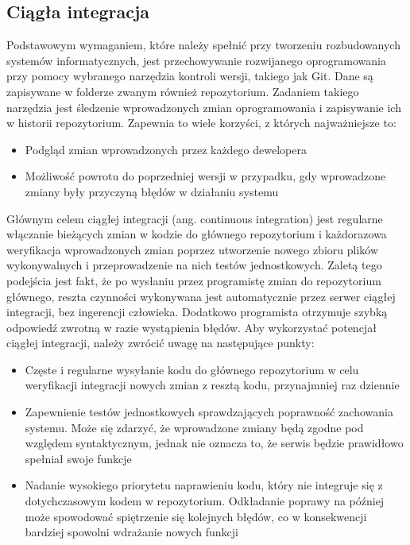 \documentclass[11pt, a4]{article} %
\begin{document}
\subsection{Ciągła integracja}

Podstawowym wymaganiem, które należy spełnić przy tworzeniu rozbudowanych systemów 
informatycznych, jest przechowywanie rozwijanego oprogramowania przy pomocy wybranego 
narzędzia kontroli wersji, takiego jak Git. Dane są zapisywane w folderze zwanym 
również repozytorium. Zadaniem takiego narzędzia jest śledzenie wprowadzonych zmian 
oprogramowania i zapisywanie ich w historii repozytorium. Zapewnia to wiele 
korzyści, z których najważniejsze to:

\begin{itemize} %
    \item Podgląd zmian wprowadzonych przez każdego dewelopera
    \item Możliwość powrotu do poprzedniej wersji w przypadku, gdy wprowadzone zmiany 
    były przyczyną błędów w działaniu systemu
\end{itemize}

Głównym celem ciągłej integracji (ang. continuous integration) jest regularne włączanie 
bieżących zmian w kodzie do głównego repozytorium i każdorazowa weryfikacja 
wprowadzonych zmian poprzez utworzenie nowego zbioru plików wykonywalnych 
i przeprowadzenie na nich testów jednostkowych. Zaletą tego podejścia jest fakt, że 
po wysłaniu przez programistę zmian do repozytorium głównego, reszta czynności 
wykonywana jest automatycznie przez serwer ciągłej integracji, bez ingerencji 
człowieka. Dodatkowo programista otrzymuje szybką odpowiedź zwrotną w razie 
wystąpienia błędów.
Aby wykorzystać potencjał ciągłej integracji, należy zwrócić uwagę na następujące 
punkty: 

\begin{itemize} %
    \item Częste i regularne wysyłanie kodu do głównego repozytorium w celu weryfikacji 
    integracji nowych zmian z resztą kodu, przynajmniej raz dziennie 
    \item Zapewnienie testów jednostkowych sprawdzających poprawność zachowania systemu. 
    Może się zdarzyć, że wprowadzone zmiany będą zgodne pod względem 
    syntaktycznym, jednak nie oznacza to, że serwis będzie prawidłowo spełniał swoje 
    funkcje 
    \item Nadanie wysokiego priorytetu naprawieniu kodu, który nie integruje się z 
    dotychczasowym kodem w repozytorium. Odkładanie poprawy na później może spowodować 
    spiętrzenie się kolejnych błędów, co w konsekwencji bardziej spowolni wdrażanie 
    nowych funkcji
\end{itemize}
\end{document}
